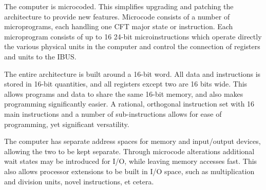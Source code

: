 \documentclass[11pt,a4paper,twocolumns]{article}
\newcommand\bus[1]{{#1}}
\newcommand\IBUS{\bus{IBUS}}
\begin{document}
The computer is microcoded. This simplifies upgrading and patching the
architecture to provide new features. Microcode consists of a number
of microprograms, each handling one CFT major state or
instruction. Each microprogram consists of up to 16 24-bit
microinstructions which operate directly the various physical units in
the computer and control the connection of registers and units to the
\IBUS.

The entire architecture is built around a 16-bit word. All data and
instructions is stored in 16-bit quantities, and all registers except
two are 16 bits wide. This allows programs and data to share the same
16-bit memory, and also makes programming significantly easier. A
rational, orthogonal instruction set with 16 main instructions and a
number of sub-instructions allows for ease of programming, yet
significant versatility.

The computer has separate address spaces for memory and input/output
devices, allowing the two to be kept separate. Through microcode
alterations additional wait states may be introduced for I/O, while
leaving memory accesses fast. This also allows processor extensions to
be built in I/O space, such as multiplication and division units,
novel instructions, et cetera.
\end{document}

